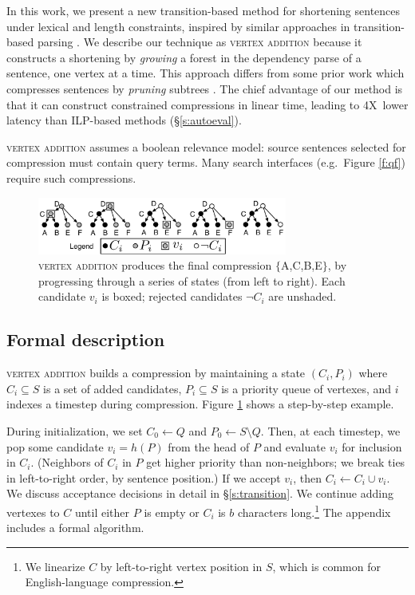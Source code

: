 \documentclass[11pt,a4paper]{article}
\newcommand{\speedup}[0]{4X~}
\begin{document}
In this work, we present a new transition-based method for shortening sentences under lexical and length constraints, inspired by similar approaches in transition-based parsing \cite{nivre2003}. We describe our technique as \textsc{vertex addition} because it constructs a shortening by \textit{growing} a forest in the dependency parse of a sentence, one vertex at a time. This approach differs from some prior work which
compresses sentences by \textit{pruning} subtrees \cite{Knight2000StatisticsBasedS,berg2011jointly,almeida2013fast,Filippova2015FastKS}. The chief advantage of our method is that it can construct constrained compressions in linear time, leading to \speedup lower latency than ILP-based methods (\S\ref{s:autoeval}). 

\textsc{vertex addition} assumes a boolean relevance model: source sentences selected for compression must contain query terms. Many search interfaces (e.g.\ Figure \ref{f:qf}) require such compressions.
\begin{figure}[h]
\includegraphics[width=8.2cm]{additive.pdf}
\caption{\textsc{vertex addition} produces the final compression $\{$A,C,B,E$\}$, by progressing through a series of states (from left to right). Each candidate $v_i$ is boxed; rejected candidates $\neg C_i$ are unshaded.}
\label{f:walkthru}
\end{figure}

\subsection{Formal description}\label{s:formal}

\textsc{vertex addition} builds a compression by maintaining a state
$(C_i,P_i)$ where $C_i \subseteq S$ is a set of added candidates, $P_i  \subseteq S$ is a priority queue of vertexes, and $i$ indexes a timestep during compression. Figure \ref{f:walkthru} shows a step-by-step example. 

During initialization, we set $C_0 \gets Q$ and $P_0 \gets S \setminus Q$. Then, at each timestep, we pop some candidate $v_i =h(P)$ from the head of $P$ and evaluate $v_i$ for inclusion in $C_i$. (Neighbors of $C_i$ in $P$ get higher priority than non-neighbors; we break ties in left-to-right order, by sentence position.) If we accept $v_i$, then $C_i \gets C_i \cup v_i$. We discuss acceptance decisions in detail in \S\ref{s:transition}. We continue adding vertexes to $C$ until either $P$ is empty or $C_i$ is $b$ characters long.\footnote{We linearize $C$ by left-to-right vertex position in $S$, which is common for English-language compression.} The appendix includes a formal algorithm. 
\end{document}
